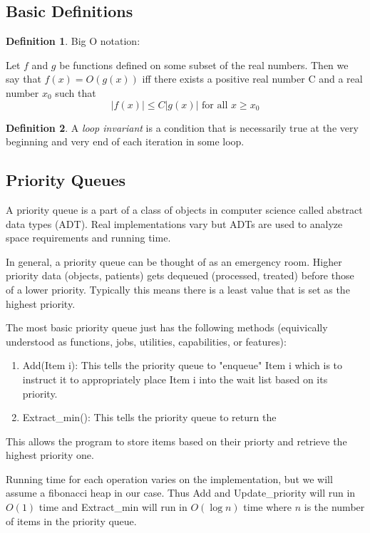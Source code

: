 \documentclass[12pt]{article}
\theoremstyle{definition}
\newtheorem{Def}{Definition}
\begin{document}
\subsection{Basic Definitions}

\begin{Def}
	Big O notation:

	Let $f$ and $g$ be functions defined on some subset of the real numbers.
	Then we say that $f(x) = O(g(x))$ iff there exists a positive real number C and a real number $x_0$ such that
	\[|f(x)| \leq C|g(x)|\text{ for all } x \geq x_0\]
\end{Def}

\begin{Def}
	A \textit{loop invariant} is a condition that is necessarily true at the very beginning and very end of each iteration in some loop.
\end{Def}

\subsection{Priority Queues}
A priority queue is a part of a class of objects in computer science called abstract data types (ADT). 
Real implementations vary but ADTs are used to analyze space requirements and running time.

In general, a priority queue can be thought of as an emergency room.
Higher priority data (objects, patients) gets dequeued (processed, treated) before those of a lower priority.
Typically this means there is a least value that is set as the highest priority.

The most basic priority queue just has the following methods (equivically understood as functions, jobs, utilities, capabilities, or features):
\begin{enumerate}
	\item Add(Item i): This tells the priority queue to "enqueue" Item i which is to instruct it to appropriately place Item i into the wait list based on its priority.
	\item Extract\_min(): This tells the priority queue to return the 
\end{enumerate}
This allows the program to store items based on their priorty and retrieve the highest priority one.

Running time for each operation varies on the implementation, but we will assume a fibonacci heap in our case.
Thus Add and Update\_priority will run in $O(1)$ time and Extract\_min will run in $O(\log n)$ time where $n$ is the number of items in the priority queue.
\end{document}

